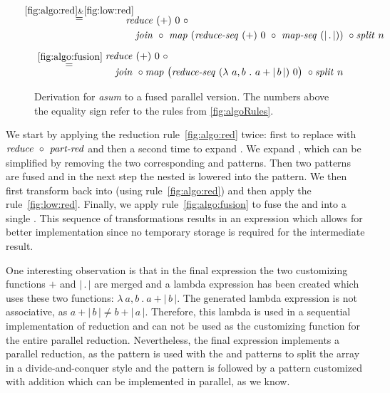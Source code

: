 \begin{figure*}[t]
\begin{align*}
\begin{aligned}
  & \overset{\hspace{-1.3em}\ref{fig:algo:red}\& \ref{fig:low:red}\hspace{-1.1em}}{=\hspace{.2em}}
      \begin{aligned}
        &\\[.5em]
        & \reduce\ (+)\ 0\ \circ\\
        &\quad \join\ \circ\ \map\ (\reduceSeq\ (+)\ 0\ \circ\ \mapSeq\ (|\, .\, |))\ \circ \splitN\ n
      \end{aligned}\\[.5em]
  & \overset{\ref{fig:algo:fusion}}{=\hspace{.2em}}
      \begin{aligned}
        & \reduce\ (+)\ 0\ \circ\\
        &\quad  \join\ \circ \map\ \big(\reduceSeq\ (\lambda\ a, b\ .\ a+|\, b\, |)\ 0\big)\ \circ \splitN\ n
      \end{aligned}
  \end{aligned}
\end{align*}
\caption{Derivation for \emph{asum} to a fused parallel version.
  The numbers above the equality sign refer to the rules from \autoref{fig:algoRules}.
}
\label{fig:derivation}
\end{figure*}


We start by applying the reduction rule~\ref{fig:algo:red} twice:
first to replace \reduce with $\text{\textit{reduce}}\ \circ\ \text{\textit{part-red}}$ and then a second time to expand \partRed.
We expand \map, which can be simplified by removing the two corresponding \join and \splitN patterns.
Then two \map patterns are fused and in the next step the nested \map is lowered into the \mapSeq pattern.
We then first transform \partRed back into \reduce (using rule~\ref{fig:algo:red}) and then apply the \OpenCL rule~\ref{fig:low:red}.
Finally, we apply rule~\ref{fig:algo:fusion} to fuse the \mapSeq and \reduceSeq into a single \reduceSeq.
This sequence of transformations results in an expression which allows for better \OpenCL implementation since no temporary storage is required for the intermediate result.

One interesting observation is that in the final expression the two customizing functions $+$ and $|\, .\,|$ are merged and a lambda expression has been created which uses these two functions: $\lambda\ a, b\ .\ a+|\, b\, |$.
The generated lambda expression is not associative, as $a+|\, b\, | \neq b+|\, a\, |$.
Therefore, this lambda is used in a sequential implementation of reduction and can not be used as the customizing function for the entire parallel reduction.
Nevertheless, the final expression implements a parallel reduction, as the \map pattern is used with the \splitN and \join patterns to split the array in a divide-and-conquer style and the \map pattern is followed by a \reduce pattern customized with addition which can be implemented in parallel, as we know.


